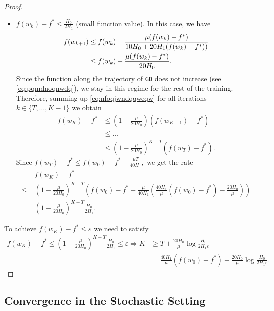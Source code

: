 \documentclass[a4paper,11pt]{article}
\newcommand{\algname}[1]{\texttt{#1}}
\newcommand{\1}{\mathbbm{1}}
\theoremstyle{plain}
\begin{document}
\begin{proof}
\begin{itemize}
        \item $f(w_k) -f^* \le \frac{H_0}{2H_1}$ (small function value). In this case, we have 
        \begin{align}\label{eq:nfoqjwndqqweqw}
            f(w_{k+1}) &\le f(w_k) - \frac{\mu(f(w_k)-f^*)}{10H_0+20H_1(f(w_k)-f^*))}\notag\\
            &\le f(w_k) - \frac{\mu(f(w_k)-f^*)}{20H_0}.
        \end{align}
        Since the function along the trajectory of \algname{GD} does not increase (see \eqref{eq:pqmdnoqnwdq}), we stay in this regime for the rest of the training. Therefore, summing up \eqref{eq:nfoqjwndqqweqw} for all iterations $k\in\{T,\dots, K-1\}$ we obtain
        \begin{align*}
           f(w_K) - f^* &\le \left(1-\frac{\mu}{20H_0}\right)(f(w_{K-1})-f^*)\\
           &\le \hdots\\
           &\le \left(1-\frac{\mu}{20H_0}\right)^{K-T}(f(w_T)-f^*).
        \end{align*}
        Since $f(w_T)-f^* \le f(w_0)-f^* - \frac{\mu T}{40H_1},$ we get the rate
        \begin{align*}
            & f(w_K)-f^*\\
            \le\; &\left(1-\frac{\mu}{20H_0}\right)^{K-T}\left(f(w_{0})-f^* - \frac{\mu }{40H_1}\left(\frac{40H_1}{\mu}(f(w_0)-f^*) - \frac{20H_0}{\mu}\right)\right)\\
            =\; &\left(1-\frac{\mu}{20H_0}\right)^{K-T}\frac{H_0}{2H_1}.
        \end{align*}

    \end{itemize}
    To achieve $f(w_K) - f^*\le \varepsilon$ we need to satisfy
    \begin{align*}
        f(w_K)-f^*\le \left(1-\frac{\mu}{20H_0}\right)^{K-T}\frac{H_0}{2H_1} \le \varepsilon \Rightarrow K &\ge T + \frac{20H_0}{\mu}\log\frac{H_0}{2H_1\varepsilon}\\
        &= \frac{40H_1}{\mu}(f(w_0)-f^*) + \frac{20H_0}{\mu}\log\frac{H_0}{2H_1\varepsilon}.
    \end{align*}
\end{proof}





\subsection{Convergence in the Stochastic Setting}
\end{document}
